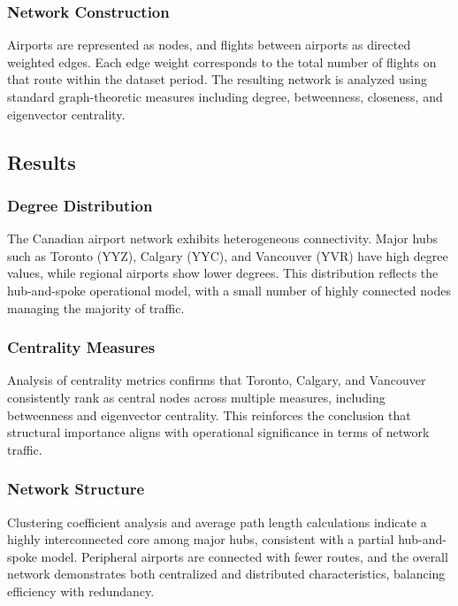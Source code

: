 \documentclass[9pt]{article}
\begin{document}
\subsubsection{Network Construction}

Airports are represented as nodes, and flights between airports as directed weighted edges. Each edge weight corresponds to the total number of flights on that route within the dataset period. The resulting network is analyzed using standard graph-theoretic measures including degree, betweenness, closeness, and eigenvector centrality.

\subsection{Results}

\subsubsection{Degree Distribution}

The Canadian airport network exhibits heterogeneous connectivity. Major hubs such as Toronto (YYZ), Calgary (YYC), and Vancouver (YVR) have high degree values, while regional airports show lower degrees. This distribution reflects the hub-and-spoke operational model, with a small number of highly connected nodes managing the majority of traffic.

\subsubsection{Centrality Measures}

Analysis of centrality metrics confirms that Toronto, Calgary, and Vancouver consistently rank as central nodes across multiple measures, including betweenness and eigenvector centrality. This reinforces the conclusion that structural importance aligns with operational significance in terms of network traffic.

\subsubsection{Network Structure}

Clustering coefficient analysis and average path length calculations indicate a highly interconnected core among major hubs, consistent with a partial hub-and-spoke model. Peripheral airports are connected with fewer routes, and the overall network demonstrates both centralized and distributed characteristics, balancing efficiency with redundancy.
\end{document}
